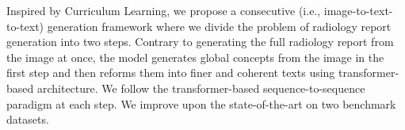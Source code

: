 Inspired by Curriculum Learning, we propose a consecutive (i.e., image-to-text-to-text) generation framework where we divide the problem of radiology report generation into two steps. Contrary to generating the full radiology report from the image at once, the model generates global concepts from the image in the first step and then reforms them into finer and coherent texts using transformer-based architecture. We follow the transformer-based sequence-to-sequence paradigm at each step. We improve upon the state-of-the-art on two benchmark datasets.
